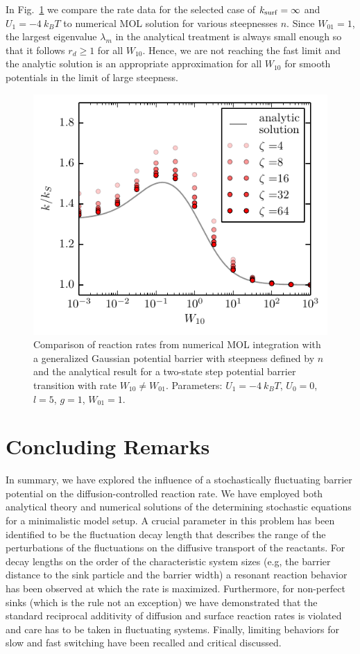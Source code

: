 \documentclass[preprint,superscriptaddress]{revtex4-1}
\begin{document}
In Fig.~\ref{fig:asymm2} we compare the rate data for the selected case of $k_{\rm surf} = \infty$ and $U_1=-4~k_BT$ to numerical MOL solution for various steepnesses $n$.  Since $W_{01}=1$,  the largest eigenvalue $\lambda_m$ in the analytical treatment is always small enough so that it follows $r_d \geq 1$ for all $W_{10}$.  Hence, we are not reaching the fast limit and the analytic solution is an appropriate approximation for all $W_{10}$ for smooth potentials 
in the limit of large steepness. 

\begin{figure}[H]
    \includegraphics[width= 0.5 \textwidth]{plots/conv_rates_for_barrier_transition.pdf}
    \caption{Comparison of reaction rates from numerical MOL integration with a  generalized Gaussian potential barrier with steepness defined by $n$ and the analytical result for a two-state step potential barrier transition with rate $W_{10}\neq W_{01}$. 
    Parameters: $U_1 = -4~k_BT $, $U_0=0$, $l=5$, $g=1$, $W_{01}=1$. }
    \label{fig:asymm2}
\end{figure}

\section{Concluding Remarks}

In summary, we have explored the influence of a stochastically fluctuating barrier potential on the diffusion-controlled reaction rate. 
We have employed both analytical theory and numerical solutions of the determining stochastic equations for  a minimalistic model setup. 
A crucial parameter in this problem has been identified  to be the fluctuation decay length that describes the range of the perturbations of the fluctuations on the diffusive transport of the reactants. 
For decay lengths on the order of the characteristic system sizes (e.g, the barrier distance to the sink particle and the 
barrier width) a resonant reaction behavior has been observed at which the rate is maximized. Furthermore, for non-perfect sinks (which
is the rule not an exception) we have demonstrated that the standard reciprocal additivity of diffusion and surface reaction rates is violated and
care has to be taken in fluctuating systems. Finally, limiting behaviors for slow and fast switching have been 
recalled and critical discussed. 
\end{document}
